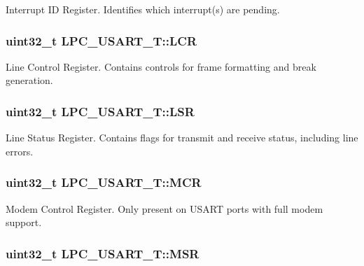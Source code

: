 Interrupt I\-D Register. Identifies which interrupt(s) are pending. \hypertarget{structLPC__USART__T_aee4d95152fdd5222436368295e4307c2}{
\subsubsection[{L\-C\-R}]{ uint32\-\_\-t L\-P\-C\-\_\-\-U\-S\-A\-R\-T\-\_\-\-T\-::\-L\-C\-R}}\label{structLPC__USART__T_aee4d95152fdd5222436368295e4307c2}
Line Control Register. Contains controls for frame formatting and break generation. \hypertarget{structLPC__USART__T_a71f711aab2dc24f42d183abd449ce829}{
\subsubsection[{L\-S\-R}]{ uint32\-\_\-t L\-P\-C\-\_\-\-U\-S\-A\-R\-T\-\_\-\-T\-::\-L\-S\-R}}\label{structLPC__USART__T_a71f711aab2dc24f42d183abd449ce829}
Line Status Register. Contains flags for transmit and receive status, including line errors. \hypertarget{structLPC__USART__T_a3fca7faf2cc9ec38e5a8566538cadf48}{
\subsubsection[{M\-C\-R}]{ uint32\-\_\-t L\-P\-C\-\_\-\-U\-S\-A\-R\-T\-\_\-\-T\-::\-M\-C\-R}}\label{structLPC__USART__T_a3fca7faf2cc9ec38e5a8566538cadf48}
Modem Control Register. Only present on U\-S\-A\-R\-T ports with full modem support. \hypertarget{structLPC__USART__T_ac4372e0a659dc1f4b5503a8825ed1971}{
\subsubsection[{M\-S\-R}]{ uint32\-\_\-t L\-P\-C\-\_\-\-U\-S\-A\-R\-T\-\_\-\-T\-::\-M\-S\-R}}\label{structLPC__USART__T_ac4372e0a659dc1f4b5503a8825ed1971}
